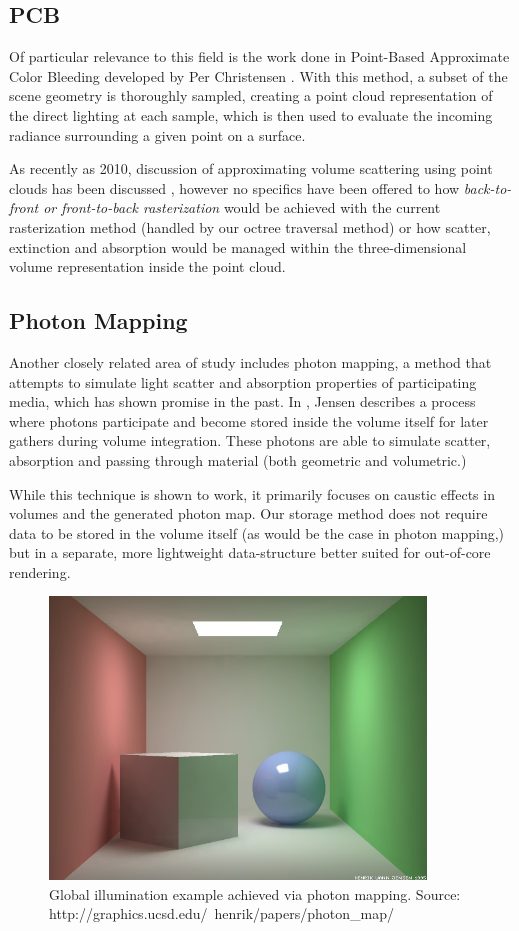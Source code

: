 \documentclass[12pt]{ucthesis}
\begin{document}
\subsection{PCB}
Of particular relevance to this field is the work done in Point-Based Approximate Color Bleeding developed by Per Christensen \cite{christensen:2008}.  With this method, a subset of the scene geometry is thoroughly sampled, creating a point cloud representation of the direct lighting at each sample, which is then used to evaluate the incoming radiance surrounding a given point on a surface.

As recently as 2010, discussion of approximating volume scattering using point clouds has been discussed \cite{christensen:siggraph}, however no specifics have been offered to how \textit{back-to-front or front-to-back rasterization} would be achieved with the current rasterization method (handled by our octree traversal method) or how scatter, extinction and absorption would be managed within the three-dimensional volume representation inside the point cloud.

\subsection{Photon Mapping}
Another closely related area of study includes photon mapping, a method that attempts to simulate light scatter and absorption properties of participating media, which has shown promise in the past.  In \cite{jensen:1998}, Jensen describes a process where photons participate and become stored inside the volume itself for later gathers during volume integration.  These photons are able to simulate scatter, absorption and passing through material (both geometric and volumetric.)

While this technique is shown to work, it primarily focuses on caustic effects in volumes and the generated photon map.  Our storage method does not require data to be stored in the volume itself (as would be the case in photon mapping,) but in a separate, more lightweight data-structure better suited for out-of-core rendering.

\begin{figure}[h!]
    \centering
    \includegraphics[width=100mm]{img/external/ewr7_mcbox.jpg}
    \caption{Global illumination example achieved via photon mapping.  Source: http://graphics.ucsd.edu/\string~henrik/papers/photon\_map/}
    \label{fig:photon}
\end{figure}
\end{document}
